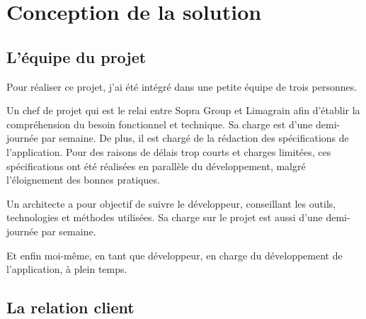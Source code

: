 \cleardoublepage

\chapter{Conception de la solution}


\section{L'équipe du projet}

Pour réaliser ce projet, j'ai été intégré dans une petite équipe de trois personnes.

Un chef de projet qui est le relai entre Sopra Group et Limagrain afin d'établir la compréhension du besoin fonctionnel et technique.
Sa charge est d'une demi-journée par semaine.
De plus, il est chargé de la rédaction des spécifications de l'application.
Pour des raisons de délais trop courts et charges limitées, ces spécifications ont été réalisées en parallèle du développement, malgré l'éloignement des bonnes pratiques.

Un architecte a pour objectif de suivre le développeur, conseillant les outils, technologies et méthodes utilisées.
Sa charge sur le projet est aussi d'une demi-journée par semaine.

Et enfin moi-même, en tant que développeur, en charge du développement de l'application, à plein temps.


\section{La relation client}


